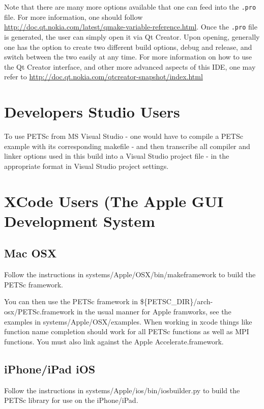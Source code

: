 {{{Note that there are many more options available that one can feed into the \texttt{.pro} file. For more information, one should follow \url{http://doc.qt.nokia.com/latest/qmake-variable-reference.html}. Once the \texttt{.pro} file is generated, the user can simply open it via Qt Creator. Upon opening, generally one has the option to create two different build options, debug and release, and switch between the two easily at any time. For more information on how to use the Qt Creator interface, and other more advanced aspects of this IDE, one may refer to \url{http://doc.qt.nokia.com/qtcreator-snapshot/index.html}

\section{Developers Studio Users} 

To use PETSc from MS Visual Studio - one would have to compile a PETSc example with its corresponding makefile - and then transcribe all compiler and linker options used in this build into a Visual Studio project file - in the appropriate format in Visual Studio project settings.

\section{XCode Users (The Apple GUI Development System} 

\subsection{Mac OSX}

Follow the instructions in systems/Apple/OSX/bin/makeframework to build the PETSc framework.

You can then use the PETSc framework in \$\{PETSC\_DIR\}/arch-osx/PETSc.framework in the usual manner for Apple framworks, see the examples in systems/Apple/OSX/examples.  When working in xcode things like function name completion should work for all PETSc functions as well as MPI functions. You must also link against the Apple Accelerate.framework.

\subsection{iPhone/iPad iOS}

Follow the instructions in systems/Apple/ios/bin/iosbuilder.py to build the PETSc library for use on the iPhone/iPad.

}}}
